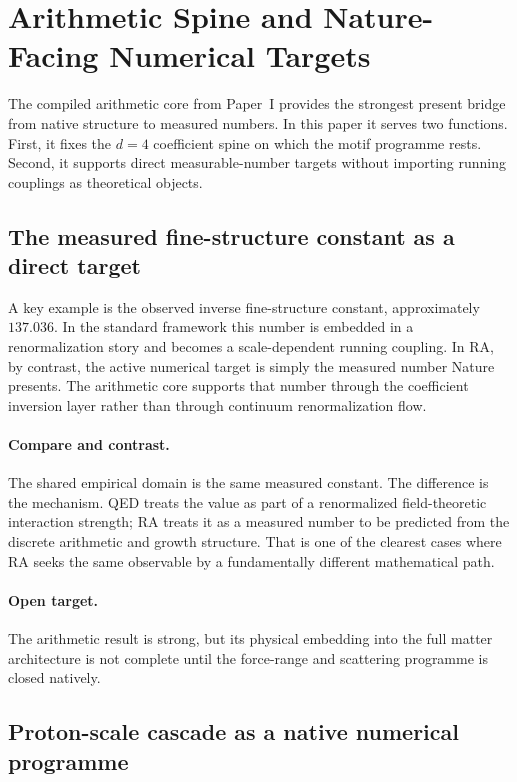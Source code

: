 \documentclass[11pt]{article}
\begin{document}
\section{Arithmetic Spine and Nature-Facing Numerical Targets}

The compiled arithmetic core from Paper~I provides the strongest present bridge from native structure to measured numbers. In this paper it serves two functions. First, it fixes the $d=4$ coefficient spine on which the motif programme rests. Second, it supports direct measurable-number targets without importing running couplings as theoretical objects.

\subsection{The measured fine-structure constant as a direct target}

A key example is the observed inverse fine-structure constant, approximately $137.036$. In the standard framework this number is embedded in a renormalization story and becomes a scale-dependent running coupling. In RA, by contrast, the active numerical target is simply the measured number Nature presents. The arithmetic core supports that number through the coefficient inversion layer rather than through continuum renormalization flow.

\paragraph{Compare and contrast.} The shared empirical domain is the same measured constant. The difference is the mechanism. QED treats the value as part of a renormalized field-theoretic interaction strength; RA treats it as a measured number to be predicted from the discrete arithmetic and growth structure. That is one of the clearest cases where RA seeks the same observable by a fundamentally different mathematical path.

\paragraph{Open target.} The arithmetic result is strong, but its physical embedding into the full matter architecture is not complete until the force-range and scattering programme is closed natively.

\subsection{Proton-scale cascade as a native numerical programme}
\end{document}
